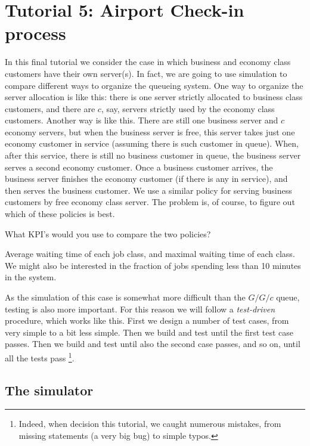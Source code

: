 \section{Tutorial 5: Airport Check-in process}
\label{sec:simul-check-proc}

In this final tutorial we consider the case in which business and economy class customers have their own server(s).
In fact, we are going to use simulation to compare different ways to organize the queueing system.
One way to organize the server allocation is like this: there is one server strictly allocated to business class customers, and there are $c$, say, servers strictly used by the economy class customers.
Another way is like this.
There are still one business server and $c$ economy servers, but when the business server is free, this server takes just one economy customer in service (assuming there is such customer in queue).
When, after this service, there is still no business customer in queue, the business server serves a second economy customer.
Once a business customer arrives, the business server finishes the economy customer (if there is any in service), and then serves the business customer.
We use a similar policy for serving business customers by free economy class server.
The problem is, of course, to figure out which of these policies is best.


\begin{exercise}
  What KPI's would you use to compare the two policies?
\begin{solution}
    Average waiting time of each job class, and maximal waiting time of each class.
    We might also be interested in the fraction of jobs spending less than 10 minutes in the system.
  \end{solution}
\end{exercise}

As the simulation of this case is somewhat more difficult than the $G/G/c$ queue, testing is also more important.
For this reason we will follow a \emph{test-driven} procedure, which works like this.
First we design a number of test cases, from very simple to a bit less simple.
Then we build and test until the first test case passes.
Then we build and test until also the second case passes, and so on, until all the tests pass \footnote{Indeed, when decision this tutorial, we caught numerous mistakes, from missing  statements (a very big bug) to simple typos.}.

\subsection{The simulator}
\label{sec:simulator-1}

